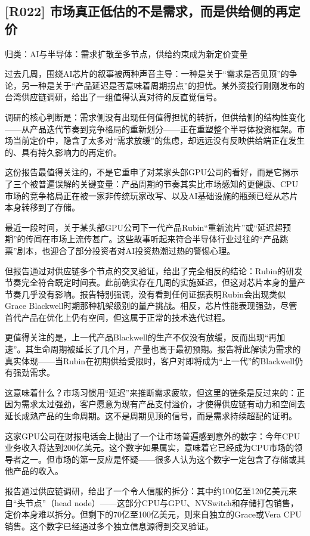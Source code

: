 \documentclass[11pt]{ctexart}
\begin{document}
\subsection{[R022] 市场真正低估的不是需求，而是供给侧的再定价}
{\small\color{refgray}归类：AI与半导体：需求扩散至多节点，供给约束成为新定价变量}

过去几周，围绕AI芯片的叙事被两种声音主导：一种是关于“需求是否见顶”的争论，另一种是关于“产品延迟是否意味着周期拐点”的担忧。某外资投行刚刚发布的台湾供应链调研，给出了一组值得认真对待的反直觉信号。

调研的核心判断是：需求侧没有出现任何值得担忧的转折，但供给侧的结构性变化——从产品迭代节奏到竞争格局的重新划分——正在重塑整个半导体投资框架。市场当前定价中，隐含了太多对“需求放缓”的焦虑，却远远没有反映供给端正在发生的、具有持久影响力的再定价。

这份报告最值得关注的，不是它重申了对某家头部GPU公司的看好，而是它揭示了三个被普遍误解的关键变量：产品周期的节奏其实比市场感知的更健康、CPU市场的竞争格局正在被一家非传统玩家改写、以及AI基础设施的瓶颈已经从芯片本身转移到了存储。

最近一段时间，关于某头部GPU公司下一代产品Rubin“重新流片”或“延迟超预期”的传闻在市场上流传甚广。这些故事听起来符合半导体行业过往的“产品跳票”剧本，也迎合了部分投资者对AI投资热潮过热的警惕心理。

但报告通过对供应链多个节点的交叉验证，给出了完全相反的结论：Rubin的研发节奏完全符合既定时间表。此前确实存在几周的实施延迟，但这对芯片本身的量产节奏几乎没有影响。报告特别强调，没有看到任何证据表明Rubin会出现类似Grace Blackwell时期那种机架级别的量产挑战。相反，芯片性能表现强劲，尽管首代产品在优化上仍有空间，但这属于正常的技术迭代过程。

更值得关注的是，上一代产品Blackwell的生产不仅没有放缓，反而出现“再加速”。其生命周期被延长了几个月，产量也高于最初预期。报告将此解读为需求的真实体现——当Rubin在初期供给受限时，客户对即将成为“上一代”的Blackwell仍有强劲需求。

这意味着什么？市场习惯用“延迟”来推断需求疲软，但这里的链条是反过来的：正因为需求太过强劲，客户愿意为现有产品支付溢价，才使得供应链有动力和空间去延长成熟产品的生命周期。这不是周期见顶的信号，而是需求持续超配的证明。

这家GPU公司在财报电话会上抛出了一个让市场普遍感到意外的数字：今年CPU业务收入将达到200亿美元。这个数字如果属实，意味着它已经成为CPU市场的领导者之一。但市场的第一反应是怀疑——很多人认为这个数字一定包含了存储或其他产品的收入。

报告通过供应链调研，给出了一个令人信服的拆分：其中约100亿至120亿美元来自“头节点”（head node）——这部分CPU与GPU、NVSwitch和存储打包销售，定价本身难以拆分。但剩下的70亿至100亿美元，则来自独立的Grace或Vera CPU销售。这个数字已经通过多个独立信息源得到交叉验证。
\end{document}
